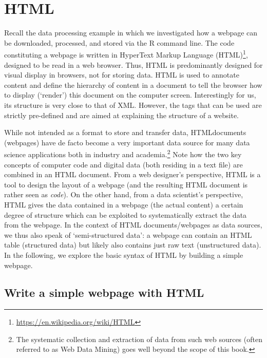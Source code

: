 \documentclass[
  12pt,
]{style/krantz}
\renewcommand{\href}[2]{#2\footnote{\url{#1}}}
\begin{document}
\hypertarget{html}{%
\section{HTML}\label{html}}

Recall the data processing example in which we investigated how a webpage can be downloaded, processed, and stored via the R command line. The code constituting a webpage is written in \href{https://en.wikipedia.org/wiki/HTML}{HyperText Markup Language (HTML)}, designed to be read in a web browser. Thus, HTML is predominantly designed for visual display in browsers, not for storing data. HTML is used to annotate content and define the hierarchy of content in a document to tell the browser how to display (`render') this document on the computer screen. Interestingly for us, its structure is very close to that of XML. However, the tags that can be used are strictly pre-defined and are aimed at explaining the structure of a website.

While not intended as a format to store and transfer data, HTMLdocuments (webpages) have de facto become a very important data source for many data science applications both in industry and academia.\footnote{The systematic collection and extraction of data from such web sources (often referred to as Web Data Mining) goes well beyond the scope of this book.} Note how the two key concepts of computer code and digital data (both residing in a text file) are combined in an HTML document. From a web designer's perspective, HTML is a tool to design the layout of a webpage (and the resulting HTML document is rather seen as \emph{code}). On the other hand, from a data scientist's perspective, HTML gives the data contained in a webpage (the actual content) a certain degree of structure which can be exploited to systematically extract the data from the webpage. In the context of HTML documents/webpages as data sources, we thus also speak of `semi-structured data': a webpage can contain an HTML table (structured data) but likely also contains just raw text (unstructured data). In the following, we explore the basic syntax of HTML by building a simple webpage.

\hypertarget{write-a-simple-webpage-with-html}{%
\subsection{Write a simple webpage with HTML}\label{write-a-simple-webpage-with-html}}
\end{document}
